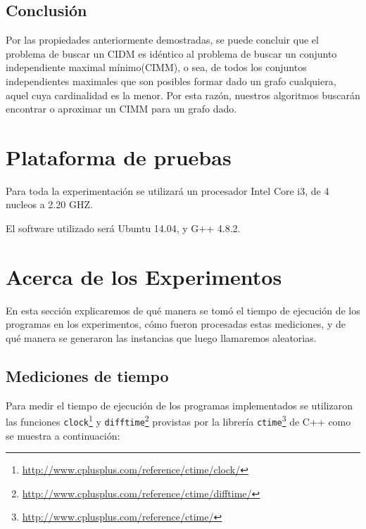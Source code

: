 \documentclass[a4paper]{article}
\begin{document}
\subsection{Conclusión}
Por las propiedades anteriormente demostradas, se puede concluir que el problema de buscar un CIDM es idéntico al problema de buscar un conjunto independiente maximal mínimo(CIMM), o sea, de todos los conjuntos independientes maximales que son posibles formar dado un grafo cualquiera, aquel cuya cardinalidad es la menor. Por esta razón, nuestros algoritmos buscarán encontrar o aproximar un CIMM para un grafo dado.

\vspace*{0.6cm}

\section{Plataforma de pruebas}

\vspace*{0.3cm}

Para toda la experimentación se utilizará un procesador Intel Core i3, de 4 nucleos a 2.20 GHZ.

El software utilizado será Ubuntu 14.04, y G++ 4.8.2.

\vspace*{0.6cm}

\section{Acerca de los Experimentos}

\vspace*{0.3cm}

En esta sección explicaremos de qué manera se tomó el tiempo de ejecución de los programas en los experimentos, cómo fueron procesadas estas mediciones, y de qué manera se generaron las instancias que luego llamaremos aleatorias.

\subsection{Mediciones de tiempo}

Para medir el tiempo de ejecución de los programas implementados se utilizaron las funciones {\tt clock}\footnote{\url{http://www.cplusplus.com/reference/ctime/clock/}} y {\tt difftime}\footnote{\url{http://www.cplusplus.com/reference/ctime/difftime/}} provistas por la librería {\tt ctime}\footnote{\url{http://www.cplusplus.com/reference/ctime/}} de C++ como se muestra a continuación:
\end{document}
